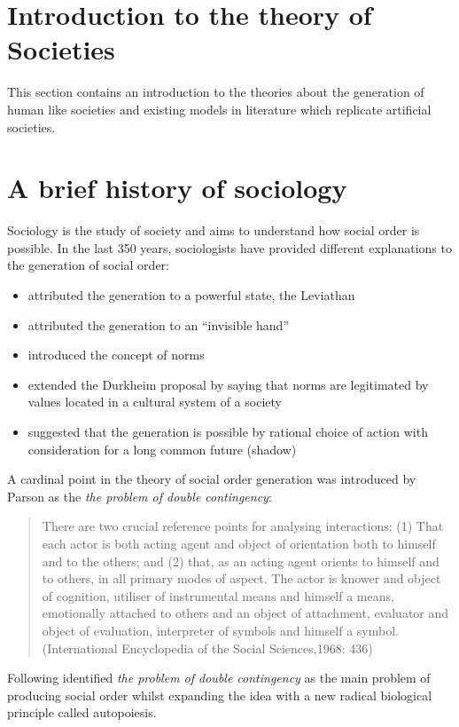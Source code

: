 \section{Introduction to the theory of Societies}
\label{Chapter1:SocialSystemTheory}
This section contains an introduction to the theories about the generation of
human like societies and existing models in literature which replicate
artificial societies.

\section{A brief history of sociology}
Sociology is the study of society and aims to understand how social order is
possible.
In the last 350 years, sociologists have provided different explanations to the
generation of social order:
\begin{itemize}
 \item \citet{Thomas1651:Leviathan} attributed the generation to
a powerful state, the Leviathan
 \item \citet{Smith1776:WealthNations} attributed the generation
to an ``invisible hand''
 \item \citet{Durkheim1893} introduced the concept of norms
 \item \citet{Parsons1937:StructureSocialAim} extended the
Durkheim proposal by saying that norms are legitimated by values located in a
cultural system of a society
 \item \citet{Axelrod1984} suggested that the generation is
possible by rational choice of action with consideration for a long common future
(shadow)
\end{itemize}
A cardinal point in the theory of social order generation was introduced by
Parson as the \textit{the problem of double contingency}:
\begin{quote}
There are two crucial reference points for analysing interactions:
(1) That each actor is both acting agent and object of orientation both to
himself and to the others; and (2) that, as an acting agent orients to himself and
to others, in all primary modes of aspect. The actor is knower and object
of cognition, utiliser of instrumental means and himself a means, emotionally
attached to others and an object of attachment, evaluator and object of
evaluation, interpreter of symbols and himself a symbol. 
(International Encyclopedia of the Social Sciences,1968: 436)
\end{quote}

Following \citet{Talcott1968:SocioTheory,Luhmann95}
identified \textit{the problem of double contingency} as the main problem of
producing social order whilst expanding the idea with a new radical biological
principle called autopoiesis.

